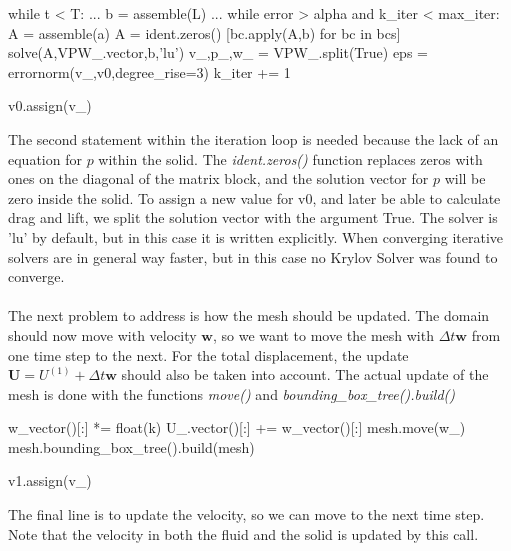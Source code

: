 \begin{cverbatim}
while t < T:
	...
	b = assemble(L)
	...
	while error > alpha and k_iter < max_iter:
		A = assemble(a)
		A = ident.zeros()
		[bc.apply(A,b) for bc in bcs]
		solve(A,VPW_.vector,b,'lu')
		v_,p_,w_ = VPW_.split(True)
		eps = errornorm(v_,v0,degree_rise=3)	
		k_iter += 1
		
		v0.assign(v_)
\end{cverbatim}
The second statement within the iteration loop is needed because the lack of an equation for $p$ within the solid. The \textit{ident.zeros()} function replaces zeros with ones on the diagonal of the matrix block, and the solution vector for $p$ will be zero inside the solid. To assign a new value for v0, and later be able to calculate drag and lift, we split the solution vector with the argument True. The solver is 'lu' by default, but in this case it is written explicitly. When converging iterative solvers are in general way faster, but in this case no Krylov Solver was found to converge. 
\\
\\
The next problem to address is how the mesh should be updated. The domain should now move with velocity $\mathbf{w}$, so we want to move the mesh with $\Delta t \mathbf{w}$ from one time step to the next. For the total displacement, the update $\mathbf{U} = U^{(1)} + \Delta t \mathbf{w}$ should also be taken into account. The actual update of the mesh is done with the functions \textit{move()} and \textit{bounding\_box\_tree().build()}
\begin{cverbatim}
	w_vector()[:] *= float(k)
	U_.vector()[:] += w_vector()[:]
	mesh.move(w_)
	mesh.bounding_box_tree().build(mesh)
	
	v1.assign(v_)
\end{cverbatim}
The final line is to update the velocity, so we can move to the next time step. Note that the velocity in both the fluid and the solid is updated by this call. \\

	
	
	


